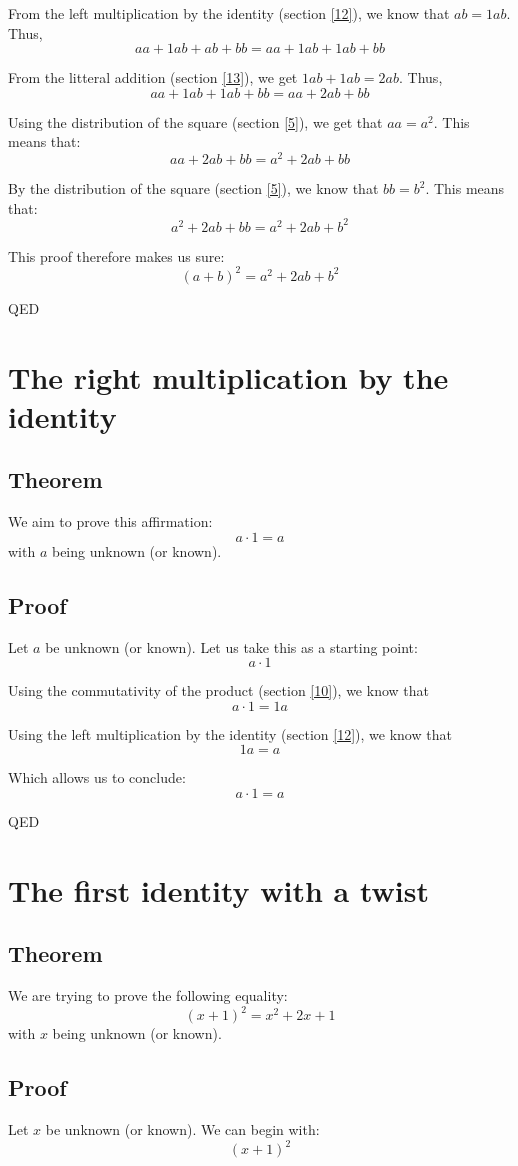 \documentclass[a4paper]{article}
\begin{document}
From the left multiplication by the identity (section \ref{12}), we know that $ab=1ab$. Thus,
\[aa+1ab+ab+bb=aa+1ab+1ab+bb\]

From the litteral addition (section \ref{13}), we get $1ab+1ab=2ab$. Thus,
\[aa+1ab+1ab+bb=aa+2ab+bb\]

Using the distribution of the square (section \ref{5}), we get that $aa=a^2$. This means that:
\[aa+2ab+bb=a^2+2ab+bb\]

By the distribution of the square (section \ref{5}), we know that $bb=b^2$. This means that:
\[a^2+2ab+bb=a^2+2ab+b^2\]

This proof therefore makes us sure:
\[\left(a+b\right)^2 = a^2+2ab+b^2\]
\begin{flushright}
QED
\end{flushright}



\section{The right multiplication by the identity\label{14}}
\subsection{Theorem}
We aim to prove this affirmation:
\[a\cdot1 = a\]
with $a$ being unknown (or known).\subsection{Proof}
Let $a$ be unknown (or known). Let us take this as a starting point:
\[a\cdot1\]

Using the commutativity of the product (section \ref{10}), we know that
\[a\cdot1=1a\]

Using the left multiplication by the identity (section \ref{12}), we know that
\[1a=a\]

Which allows us to conclude:
\[a\cdot1 = a\]
\begin{flushright}
QED
\end{flushright}



\section{The first identity with a twist\label{3}}
\subsection{Theorem}
We are trying to prove the following equality:
\[\left(x + 1\right)^2 = x^2 + 2x + 1\]
with $x$ being unknown (or known).\subsection{Proof}
Let $x$ be unknown (or known). We can begin with:
\[\left(x+1\right)^2\]
\end{document}
